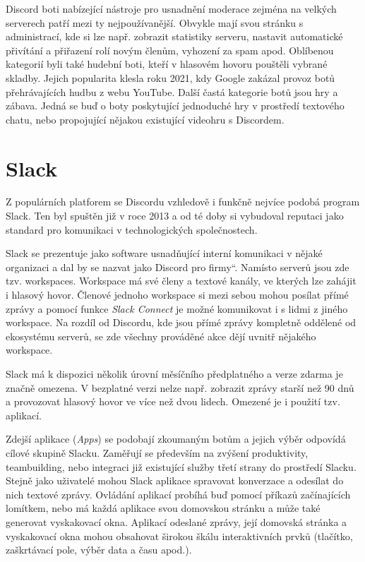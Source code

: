 \documentclass[FM]{tulthesis}
\begin{document}
	Discord boti nabízející nástroje pro usnadnění moderace zejména na velkých serverech patří mezi ty nejpoužívanější. Obvykle mají svou stránku s administrací, kde si lze např. zobrazit statistiky serveru, nastavit automatické přivítání a přiřazení rolí novým členům, vyhození za spam apod. Oblíbenou kategorií byli také hudební boti, kteří v hlasovém hovoru pouštěli vybrané skladby. Jejich popularita klesla roku 2021, kdy Google zakázal provoz botů přehrávajících hudbu z webu \mbox{YouTube}. Další častá kategorie botů jsou hry a zábava. Jedná se buď o boty poskytující jednoduché hry v prostředí textového chatu, nebo propojující nějakou existující videohru s Discordem.
	
	\section{Slack}
	
	Z populárních platforem se Discordu vzhledově i funkčně nejvíce podobá program Slack. Ten byl spuštěn již v roce 2013 a od té doby si vybudoval reputaci jako standard pro komunikaci v technologických společnostech. \cite{lit_Discord}
	
	Slack se prezentuje jako software usnadňující interní komunikaci v nějaké organizaci a dal by se nazvat jako \quotedblbase Discord pro firmy\textquotedblleft. Namísto serverů jsou zde tzv. workspaces. Workspace má své členy a textové kanály, ve kterých lze zahájit i hlasový hovor. Členové jednoho workspace si mezi sebou mohou posílat přímé zprávy a pomocí funkce \textit{Slack Connect} je možné komunikovat i s lidmi z jiného workspace. Na rozdíl od Discordu, kde jsou přímé zprávy kompletně oddělené od ekosystému serverů, se zde všechny prováděné akce dějí uvnitř nějakého workspace.
	
	Slack má k dispozici několik úrovní měsíčního předplatného a verze zdarma je značně omezena. V bezplatné verzi nelze např. zobrazit zprávy starší než 90 dnů a provozovat hlasový hovor ve více než dvou lidech. Omezené je i použití tzv. aplikací.
	
	Zdejší aplikace (\textit{Apps}) se podobají zkoumaným botům a jejich výběr odpovídá cílové skupině Slacku. Zaměřují se především na zvýšení produktivity, teambuilding, nebo integraci již existující služby třetí strany do prostředí Slacku. Stejně jako uživatelé mohou Slack aplikace spravovat konverzace a odesílat do nich textové zprávy. Ovládání aplikací probíhá buď pomocí příkazů začínajících lomítkem, nebo má každá aplikace svou domovskou stránku a může také generovat vyskakovací okna. Aplikací odeslané zprávy, její domovská stránka a vyskakovací okna mohou obsahovat širokou škálu interaktivních prvků (tlačítko, zaškrtávací pole, výběr data a času apod.).
	
\end{document}
